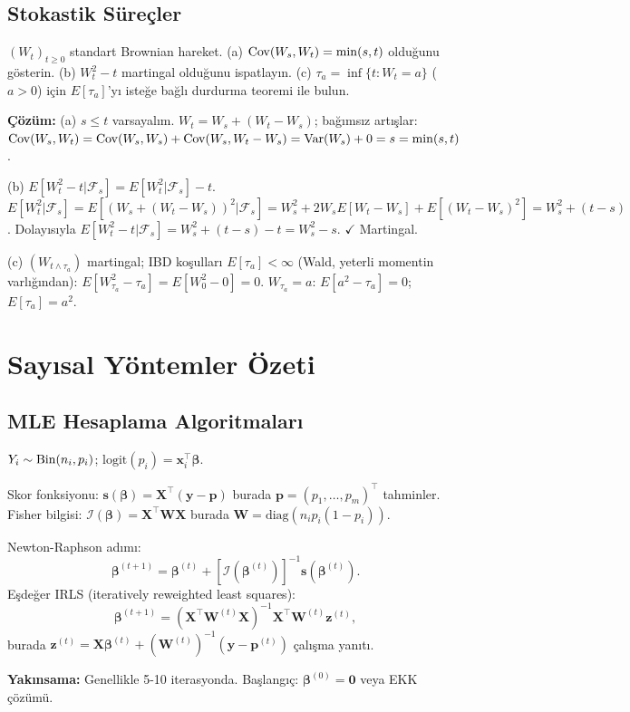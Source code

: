 \subsection{Stokastik Süreçler}

\begin{ornek}
$(W_t)_{t\geq0}$ standart Brownian hareket.
(a) $\operatorname{Cov}(W_s,W_t)=\min(s,t)$ olduğunu gösterin.
(b) $W_t^2-t$ martingal olduğunu ispatlayın.
(c) $\tau_a=\inf\{t:W_t=a\}$ ($a>0$) için $E[\tau_a]$'yı isteğe bağlı durdurma teoremi ile bulun.

\textbf{Çözüm:}
(a) $s\leq t$ varsayalım. $W_t=W_s+(W_t-W_s)$; bağımsız artışlar:
$\operatorname{Cov}(W_s,W_t)=\operatorname{Cov}(W_s,W_s)+\operatorname{Cov}(W_s,W_t-W_s)=\operatorname{Var}(W_s)+0=s=\min(s,t)$.

(b) $E[W_t^2-t|\mathcal{F}_s]=E[W_t^2|\mathcal{F}_s]-t$.
$E[W_t^2|\mathcal{F}_s]=E[(W_s+(W_t-W_s))^2|\mathcal{F}_s]=W_s^2+2W_sE[W_t-W_s]+E[(W_t-W_s)^2]=W_s^2+(t-s)$.
Dolayısıyla $E[W_t^2-t|\mathcal{F}_s]=W_s^2+(t-s)-t=W_s^2-s$. $\checkmark$ Martingal.

(c) $(W_{t\wedge\tau_a})$ martingal; IBD koşulları $E[\tau_a]<\infty$ (Wald, yeterli momentin varlığından):
$E[W_{\tau_a}^2-\tau_a]=E[W_0^2-0]=0$. $W_{\tau_a}=a$: $E[a^2-\tau_a]=0$; $E[\tau_a]=a^2$.
\end{ornek}

\section{Sayısal Yöntemler Özeti}
\label{app:sayisal_ozet}

\subsection{MLE Hesaplama Algoritmaları}

\begin{ornek}
$Y_i\sim\operatorname{Bin}(n_i,p_i)$; $\mathrm{logit}(p_i)=\mathbf{x}_i^\top\boldsymbol\beta$.

Skor fonksiyonu: $\mathbf{s}(\boldsymbol\beta)=\mathbf{X}^\top(\mathbf{y}-\mathbf{p})$ burada $\mathbf{p}=(p_1,\ldots,p_m)^\top$ tahminler.
Fisher bilgisi: $\mathcal{I}(\boldsymbol\beta)=\mathbf{X}^\top\mathbf{W}\mathbf{X}$ burada $\mathbf{W}=\mathrm{diag}(n_ip_i(1-p_i))$.

Newton-Raphson adımı:
\[
  \boldsymbol\beta^{(t+1)} = \boldsymbol\beta^{(t)} + [\mathcal{I}(\boldsymbol\beta^{(t)})]^{-1}\mathbf{s}(\boldsymbol\beta^{(t)}).
\]
Eşdeğer IRLS (iteratively reweighted least squares):
\[
  \boldsymbol\beta^{(t+1)} = (\mathbf{X}^\top\mathbf{W}^{(t)}\mathbf{X})^{-1}\mathbf{X}^\top\mathbf{W}^{(t)}\mathbf{z}^{(t)},
\]
burada $\mathbf{z}^{(t)}=\mathbf{X}\boldsymbol\beta^{(t)}+(\mathbf{W}^{(t)})^{-1}(\mathbf{y}-\mathbf{p}^{(t)})$ çalışma yanıtı.

\textbf{Yakınsama:} Genellikle 5-10 iterasyonda. Başlangıç: $\boldsymbol\beta^{(0)}=\mathbf{0}$ veya EKK çözümü.
\end{ornek}

